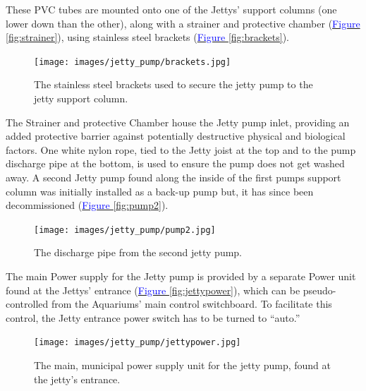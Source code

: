\documentclass[
  12pt,
]{report}
\begin{document}
These PVC tubes are mounted onto one of the Jettys' support columns (one
lower down than the other), along with a strainer and protective chamber
(\ul{\textcolor{blue}{Figure \ref{fig:strainer}}}), using stainless
steel brackets (\ul{\textcolor{blue}{Figure \ref{fig:brackets}}}).

\begin{figure}[H]

{\centering \texttt{[image: images/jetty\_pump/brackets.jpg]}

}

\caption{The stainless steel brackets used to secure the jetty pump to
the jetty support column.}

\end{figure}

The Strainer and protective Chamber house the Jetty pump inlet,
providing an added protective barrier against potentially destructive
physical and biological factors. One white nylon rope, tied to the Jetty
joist at the top and to the pump discharge pipe at the bottom, is used
to ensure the pump does not get washed away. A second Jetty pump found
along the inside of the first pumps support column was initially
installed as a back-up pump but, it has since been decommissioned
(\ul{\textcolor{blue}{Figure \ref{fig:pump2}}}).

\begin{figure}[H]

{\centering \texttt{[image: images/jetty\_pump/pump2.jpg]}

}

\caption{The discharge pipe from the second jetty pump.}

\end{figure}

The main Power supply for the Jetty pump is provided by a separate Power
unit found at the Jettys' entrance
(\ul{\textcolor{blue}{Figure \ref{fig:jettypower}}}), which can be
pseudo-controlled from the Aquariums' main control switchboard. To
facilitate this control, the Jetty entrance power switch has to be
turned to ``auto.''

\begin{figure}[H]

{\centering \texttt{[image: images/jetty\_pump/jettypower.jpg]}

}

\caption{The main, municipal power supply unit for the jetty pump, found
at the jetty's entrance.}

\end{figure}
\end{document}
